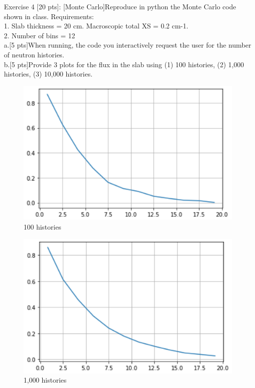 \documentclass[12pt,fleqn, parskip=full]{scrartcl}
\begin{document}
Exercise 4 [20 pts]: [Monte Carlo]Reproduce in python the Monte Carlo code shown in class.  Requirements:\\
1. Slab thickness = 20 cm. Macroscopic total XS = 0.2 cm-1. \\
2. Number of bins = 12 \\
a.[5 pts]When running, the code you interactively request the user for the number of neutron histories.\\
b.[5 pts]Provide 3 plots for the flux in the slab using (1) 100 histories, (2) 1,000 histories, (3) 10,000 histories.\\
\begin{figure}[H]
	\centering
	\includegraphics[scale=1]{Image_4_hw_2}
	\caption{100 histories}
\end{figure}
\begin{figure}[H]
	\centering
	\includegraphics[scale=1]{Image_5_hw_2}
	\caption{1,000 histories}
\end{figure}
\end{document}
